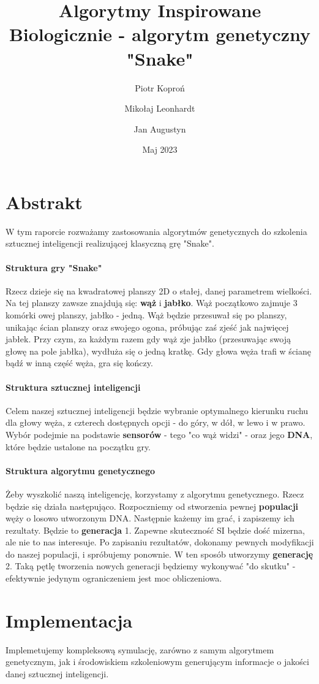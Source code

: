 \documentclass{article}
\author{Piotr Koproń \and Mikołaj Leonhardt \and Jan Augustyn}
\date{Maj 2023}
\title{Algorytmy Inspirowane Biologicznie - algorytm genetyczny "Snake"}
\begin{document}
\maketitle
\newpage
\section{Abstrakt}
W tym raporcie rozważamy zastosowania algorytmów genetycznych do szkolenia sztucznej inteligencji realizującej klasyczną grę "Snake".
\paragraph{Struktura gry "Snake"}
Rzecz dzieje się na kwadratowej planszy 2D o stałej, danej parametrem wielkości. Na tej planszy zawsze znajdują się: \textbf{wąż} i \textbf{jabłko}. Wąż początkowo zajmuje 3 komórki owej planszy, jabłko - jedną. Wąż będzie przesuwał się po planszy, unikając ścian planszy oraz swojego ogona, próbując zaś zjeść jak najwięcej jabłek. Przy czym, za każdym razem gdy wąż zje jabłko (przesuwając swoją głowę na pole jabłka), wydłuża się o jedną kratkę.
Gdy głowa węża trafi w ścianę bądź w  inną część węża, gra się kończy.
\paragraph{Struktura sztucznej inteligencji}
Celem naszej sztucznej inteligencji będzie wybranie optymalnego kierunku ruchu dla głowy węża, z czterech dostępnych opcji - do góry, w dół, w lewo i w prawo. Wybór podejmie na podstawie \textbf{sensorów} - tego "co wąż widzi" - oraz jego \textbf{DNA}, które będzie ustalone na początku gry.
\paragraph{Struktura algorytmu genetycznego}
Żeby wyszkolić naszą inteligencję, korzystamy z algorytmu genetycznego. Rzecz będzie się działa następująco.
Rozpoczniemy od stworzenia pewnej \textbf{populacji} węży o losowo utworzonym DNA. Następnie każemy im grać, i zapiszemy ich rezultaty. Będzie to \textbf{generacja} 1. Zapewne skuteczność SI będzie dość mizerna, ale nie to nas interesuje. Po zapisaniu rezultatów, dokonamy pewnych modyfikacji do naszej populacji, i spróbujemy ponownie. W ten sposób utworzymy \textbf{generację} 2. Taką pętlę tworzenia nowych generacji będziemy wykonywać "do skutku" - efektywnie jedynym ograniczeniem jest moc obliczeniowa. 
\section{Implementacja}
Implemetujemy kompleksową symulację, zarówno z samym algorytmem genetycznym, jak i środowiskiem szkoleniowym generującym informacje o jakości danej sztucznej inteligencji.
\end{document}
